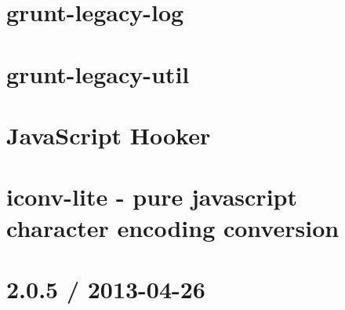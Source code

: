 \documentclass[twoside]{book}
\newcommand{\+}{\discretionary{\mbox{\scriptsize$\hookleftarrow$}}{}{}}
\begin{document}
\chapter{grunt-\/legacy-\/log}
\label{md__c_1__users_martin__documents__git_hub_visual_studio__bachelor__wis_r__wis_r_node_modules_gru997d85ccc8d68d44a94bc164e641e236}
\hypertarget{md__c_1__users_martin__documents__git_hub_visual_studio__bachelor__wis_r__wis_r_node_modules_gru997d85ccc8d68d44a94bc164e641e236}{}

\chapter{grunt-\/legacy-\/util}
\label{md__c_1__users_martin__documents__git_hub_visual_studio__bachelor__wis_r__wis_r_node_modules_gru125f6fb9dcd9ff941d7b782a28699c22}
\hypertarget{md__c_1__users_martin__documents__git_hub_visual_studio__bachelor__wis_r__wis_r_node_modules_gru125f6fb9dcd9ff941d7b782a28699c22}{}

\chapter{Java\+Script Hooker}
\label{md__c_1__users_martin__documents__git_hub_visual_studio__bachelor__wis_r__wis_r_node_modules_gru1195ebc201fc06dd0662b8f3e2765d29}
\hypertarget{md__c_1__users_martin__documents__git_hub_visual_studio__bachelor__wis_r__wis_r_node_modules_gru1195ebc201fc06dd0662b8f3e2765d29}{}

\chapter{iconv-\/lite -\/ pure javascript character encoding conversion}
\label{md__c_1__users_martin__documents__git_hub_visual_studio__bachelor__wis_r__wis_r_node_modules_gru86e847d72cd9e0e03df9554122d5bf6d}
\hypertarget{md__c_1__users_martin__documents__git_hub_visual_studio__bachelor__wis_r__wis_r_node_modules_gru86e847d72cd9e0e03df9554122d5bf6d}{}

\chapter{2.0.5 / 2013-\/04-\/26}
\label{md__c_1__users_martin__documents__git_hub_visual_studio__bachelor__wis_r__wis_r_node_modules_grube79172aa5e906584f00600c59df73cc}
\hypertarget{md__c_1__users_martin__documents__git_hub_visual_studio__bachelor__wis_r__wis_r_node_modules_grube79172aa5e906584f00600c59df73cc}{}

\end{document}
